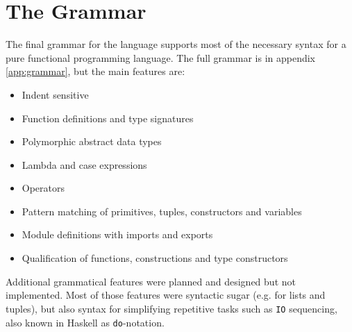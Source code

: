 \section{The Grammar}

The final grammar for the language supports most of the necessary syntax for a pure functional programming language.  The full grammar is in appendix \ref{app:grammar}, but the main features are:

\begin{itemize}
  \item Indent sensitive
  \item Function definitions and type signatures
  \item Polymorphic abstract data types
  \item Lambda and case expressions
  \item Operators
  \item Pattern matching of primitives, tuples, constructors and variables
  \item Module definitions with imports and exports
  \item Qualification of functions, constructions and type constructors
\end{itemize}

Additional grammatical features %
were planned and designed but not implemented. Most of those features were syntactic sugar (e.g. for lists and tuples), but also syntax for simplifying repetitive tasks such as \texttt{IO} sequencing, also known in Haskell as \texttt{do}-notation. 